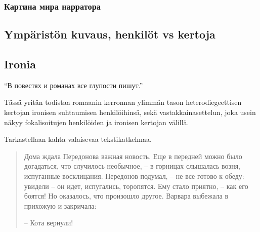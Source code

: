 \documentclass[12pt,a4paper]{article}
\begin{document}
\subsubsection{Картина мира нарратора}

\subsection{Ympäristön kuvaus, henkilöt vs kertoja}

\subsection{Ironia}

\enquote{В повестях и романах все глупости пишут.} \parencite[54]{sologub2004}



Tässä yritän todistaa romaanin kerronnan ylimmän tason heterodiegeettisen kertojan ironisen suhtaumisen henkilöihinsä, sekä vastakkainasettelun, joka usein näkyy fokalisoitujen henkilöiden ja ironisen kertojan välillä.
% 
% 
% 
%

Tarkastellaan kahta valaisevaa tekstikatkelmaa.

\begin{quote}
Дома ждала Передонова важная новость. Еще в передней можно
было догадаться, что случилось необычное, – в горницах слышалась 
возня, испуганные восклицания. Передонов подумал, – не все
готово к обеду: увидели – он идет, испугались, торопятся. Ему стало
приятно, – как его боятся! Но оказалось, что произошло другое. 
Варвара выбежала в прихожую и закричала:

– Кота вернули!

\parencite[171.]{sologub2004}

\end{quote}
\end{document}
